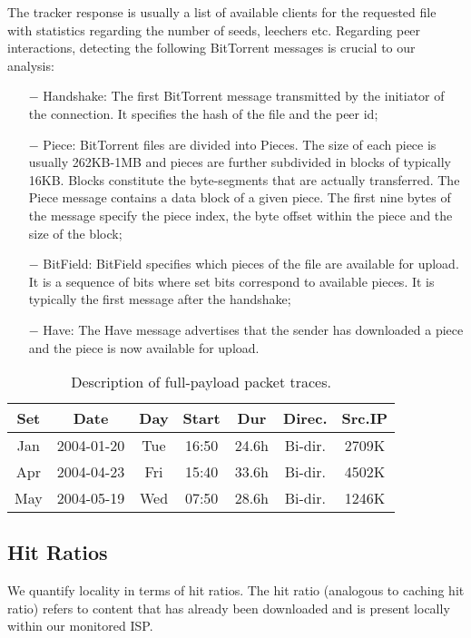 \documentclass[12pt]{ilu}
\begin{document}
The tracker response is usually a list of available clients for the requested file with statistics regarding the number of seeds, leechers etc. Regarding peer interactions, detecting the following BitTorrent messages is crucial to our analysis:
\begin{itemize}
    \item [$-$]	Handshake: The first BitTorrent message transmitted by the initiator of the connection. It specifies the hash of the file and the peer id; 
    \item [$-$] Piece: BitTorrent files are divided into Pieces. The size of each piece is usually 262KB-1MB and pieces are further subdivided in blocks of typically 16KB. Blocks constitute the byte-segments that are actually transferred. The Piece message contains a data block of a given piece. The first nine bytes of the message specify the piece index, the byte offset within the piece and the size of the block;
    \item [$-$] BitField: BitField specifies which pieces of the file are available for upload. It is a sequence of bits where set bits correspond to available pieces. It is typically the first message after the handshake; 
    \item [$-$] Have: The Have message advertises that the sender has downloaded a piece and the piece is now available for upload. 
\end{itemize}
\begin{table}[H]
\caption{Description of full-payload packet traces.}
\label{tabular:timesandtenses}
\begin{center}
\begin{tabular}{|c|c|c|c|c|c|c|}
\hline
Set&Date&Day&Start&Dur&Direc.&Src.IP\\
\hline
Jan&2004-01-20&Tue&16:50&24.6h&Bi-dir.&2709K\\
\hline
Apr&2004-04-23&Fri&15:40&33.6h&Bi-dir.&4502K\\
\hline
May&2004-05-19&Wed&07:50&28.6h&Bi-dir.&1246K\\
\hline
\end{tabular}
\end{center}
\end{table}

\subsection{Hit Ratios}
We quantify locality in terms of hit ratios. The hit ratio (analogous to caching hit ratio) refers to content that has already been downloaded and is present locally within our monitored ISP. 
\end{document}
